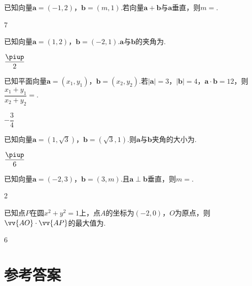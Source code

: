 \begin{exercise}
    \item %
      已知向量$\bm a=(-1,2)$，$\bm b=(m,1)$.若向量$\bm a+\bm b$与$\bm a$垂直，则$m=$\tk.
      \begin{answer}
        7
      \end{answer}
    \item %
      已知向量$\bm a=(1,2)$，$\bm b=(-2,1)$.$\bm a$与$\bm b$的夹角为\tk.
      \begin{answer}
        $\dfrac{\piup}2$
      \end{answer}
    \item %
      已知平面向量$\bm a=(x_1,y_1)$，$\bm b=(x_2,y_2)$.若$|\bm a|=3$，$|\bm b|=4$，$\bm a\cdot \bm b=12$，则$\dfrac{x_1+y_1}{x_2+y_2}=$\tk.
      \begin{answer}
        $-\dfrac34$
      \end{answer}
    \item %
      已知向量$\bm a=(1,\sqrt3)$，$\bm b=(\sqrt3,1)$.则$\bm a$与$\bm b$夹角的大小为\tk.
      \begin{answer}
        $\dfrac{\piup}6$
      \end{answer}
    \item %
      已知向量$\bm a=(-2,3)$，$\bm b=(3,m)$.且$\bm a\perp \bm b$垂直，则$m=$\tk.
      \begin{answer}
        2
      \end{answer}
    \item %
      已知点$P$在圆$x^2+y^2=1$上，点$A$的坐标为$(-2,0)$，$O$为原点，则$\vv{AO}\cdot\vv{AP}$的最大值为\tk.
      \begin{answer}
        6
      \end{answer}
  \end{exercise}
\stopexercise

\newpage
\section{参考答案}
\begin{multicols}{2}
  \printanswer
\end{multicols}
